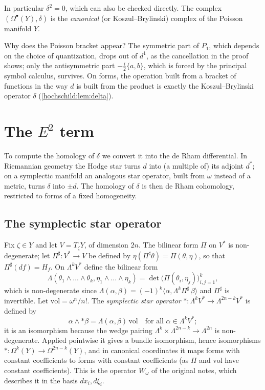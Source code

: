 In particular $\delta^2=0$, which can also be checked directly. The complex
$(\Omega^\bullet(Y),\delta)$ is the \emph{canonical} (or Koszul--Brylinski)
complex of the Poisson manifold $Y$.

\begin{discussion}
Why does the Poisson bracket appear? The symmetric part of $P_1$, which
depends on the choice of quantization, drops out of $d^1$, as the
cancellation in the proof shows; only the antisymmetric part
$-\frac i2\{a,b\}$, which is forced by the principal symbol calculus,
survives. On forms, the operation built from a
bracket of functions in the way $d$ is built from the product is exactly the
Koszul--Brylinski operator $\delta$ (\cref{hochschild:lem:delta}).
\end{discussion}

\section{The \texorpdfstring{$E^2$}{E2} term}\label{hochschild:sec:E2}

To compute the homology of $\delta$ we convert it into the de Rham
differential. In Riemannian geometry the Hodge star turns $d$ into (a
multiple of) its adjoint $d^*$; on a symplectic manifold an analogous star
operator, built from $\omega$ instead of a metric, turns $\delta$ into
$\pm d$. The homology of $\delta$ is then de Rham cohomology, restricted to
forms of a fixed homogeneity.

\subsection{The symplectic star operator}
Fix $\zeta\in Y$ and let $V=T_\zeta Y$, of dimension $2n$. The bilinear form
$\Pi$ on $V^*$ is non-degenerate; let $\Pi^\sharp:V^*\to V$ be defined by
$\eta(\Pi^\sharp\theta)=\Pi(\theta,\eta)$, so that $\Pi^\sharp(df)=H_f$. On
$\Lambda^kV^*$ define the bilinear form
\begin{equation*}
  \Lambda(\theta_1\wedge\dots\wedge\theta_k,\eta_1\wedge\dots\wedge\eta_k)
  =\det\bigl(\Pi(\theta_i,\eta_j)\bigr)_{i,j=1}^k ,
\end{equation*}
which is non-degenerate since $\Lambda(\alpha,\beta)=(-1)^k\langle\alpha,
\Lambda^k\Pi^\sharp\,\beta\rangle$ and $\Pi^\sharp$ is invertible. Let
$\mathrm{vol}=\omega^n/n!$. The \emph{symplectic star operator}
$*:\Lambda^kV^*\to\Lambda^{2n-k}V^*$ is defined by
\begin{equation*}
  \alpha\wedge{*\beta}=\Lambda(\alpha,\beta)\,\mathrm{vol}\quad\text{for all }\alpha\in\Lambda^kV^*;
\end{equation*}
it is an isomorphism because the wedge pairing
$\Lambda^k\times\Lambda^{2n-k}\to\Lambda^{2n}$ is non-degenerate. Applied
pointwise it gives a bundle isomorphism, hence isomorphisms
$*:\Omega^k(Y)\to\Omega^{2n-k}(Y)$, and in canonical coordinates it maps forms
with constant coefficients to forms with constant coefficients (as $\Pi$ and
$\mathrm{vol}$ have constant coefficients). This is the operator $W_\omega$
of the original notes, which describes it in the basis $dx_{i},d\xi_i$.

